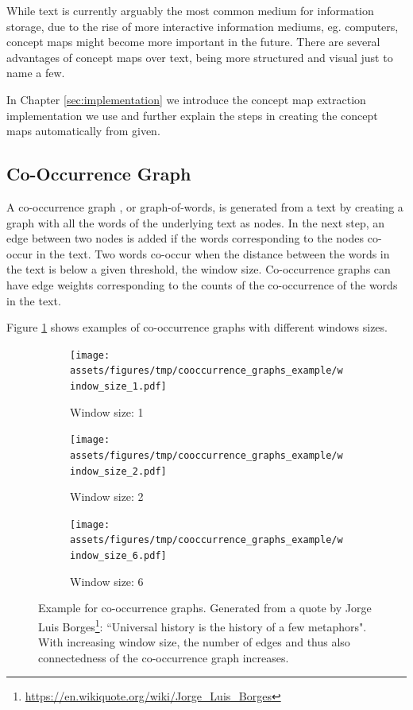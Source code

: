 While text is currently arguably the most common medium for information storage, due to the rise of more interactive information mediums, eg. computers, concept maps might become more important in the future.
There are several advantages of concept maps over text, being more structured and visual just to name a few.

In Chapter \ref{sec:implementation} we introduce the concept map extraction implementation we use and further explain the steps in creating the concept maps automatically from given.

\subsection{Co-Occurrence Graph}
A co-occurrence graph \cite{Novak1984, Rousseau2015a, Nikolentzos2017a}, or graph-of-words, is generated from a text by creating a graph with all the words of the underlying text as nodes.
In the next step, an edge between two nodes is added if the words corresponding to the nodes co-occur in the text.
Two words co-occur when the distance between the words in the text is below a given threshold, the window size.
Co-occurrence graphs can have edge weights corresponding to the counts of the co-occurrence of the words in the text.

Figure \ref{fig:cooccurrence_graphs} shows examples of co-occurrence graphs with different windows sizes.

\begin{figure}[htb!]%
    \centering
    \begin{subfigure}[t]{0.32\linewidth}{\texttt{[image: assets/figures/tmp/cooccurrence\_graphs\_example/window\_size\_1.pdf]}}%
    \caption{Window size: 1}%
    \end{subfigure}
    \begin{subfigure}[t]{0.32\linewidth}{\texttt{[image: assets/figures/tmp/cooccurrence\_graphs\_example/window\_size\_2.pdf]}}%
    \caption{Window size: 2}%
    \end{subfigure}
	\begin{subfigure}[t]{0.32\linewidth}{\texttt{[image: assets/figures/tmp/cooccurrence\_graphs\_example/window\_size\_6.pdf]}}%
    \caption{Window size: 6}%
    \end{subfigure}
    \caption[Example: Co-Occurrence Graph]{Example for co-occurrence graphs. Generated from a quote by Jorge Luis Borges\footnote{\url{https://en.wikiquote.org/wiki/Jorge\_Luis\_Borges}}: ``Universal history is the history of a few metaphors".
    	With increasing window size, the number of edges and thus also connectedness of the co-occurrence graph increases.}%
    \label{fig:cooccurrence_graphs}%
\end{figure}

